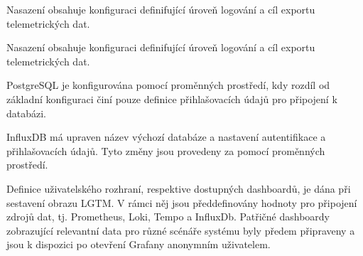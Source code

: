 
Nasazení obsahuje konfiguraci definifující úroveň logování a cíl exportu telemetrických dat.


Nasazení obsahuje konfiguraci definifující úroveň logování a cíl exportu telemetrických dat.



PostgreSQL je konfigurována pomocí proměnných prostředí, kdy rozdíl od základní konfiguraci činí pouze definice přihlašovacích údajů pro připojení k databázi.


InfluxDB má upraven název výchozí databáze a nastavení autentifikace a přihlašovacích údajů. Tyto změny jsou provedeny za pomocí proměnných prostředí.


Definice uživatelského rozhraní, respektive dostupných dashboardů, je dána při sestavení obrazu LGTM. V rámci něj jsou předdefinovány hodnoty pro připojení zdrojů dat, tj. Prometheus, Loki, Tempo a InfluxDb. Patřičné dashboardy zobrazující relevantní data pro různé scénáře systému byly předem připraveny a jsou k dispozici po otevření Grafany anonymním uživatelem.

